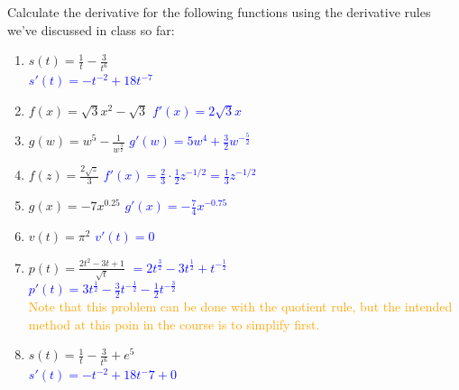 \documentclass{ximera}
\begin{document}
\begin{exercise}
Calculate the derivative for the following functions using the derivative rules we've discussed in class so far: 
\begin{enumerate}
    \item $s(t)=\frac{1}{t}-\frac{3}{t^6}$\\
    \textcolor{blue}{$s'(t)=-t^{-2}+18t^{-7}$}

    \item $f(x)=\sqrt{3}x^2-\sqrt{3}$
    \textcolor{blue}{ $f'(x)=2\sqrt{3}x$}
    
    \item $g(w)=w^5-\frac{1}{w^\frac{3}{2}}$
    \textcolor{blue}{ $g'(w)=5w^4+\frac{3}{2}w^{-\frac{5}{2}}$}
    
    \item $f(z)=\frac{2\sqrt{z}}{3}$ 
    \textcolor{blue}{ $f'(x)= \frac{2}{3}\cdot \frac12 z^{-1/2}=\frac13 z^{-1/2}$}
    
    \item $g(x)=-7x^{0.25}$
    \textcolor{blue}{ $g'(x)=-\frac{7}{4}x^{-0.75}$}
    
    \item $v(t)=\pi^2$
    \textcolor{blue}{ $v'(t)=0$}
    
    \item $p(t)=\frac{2t^2-3t+1}{\sqrt{t}}$ \textcolor{blue}{ $=2t^{\frac32}-3t^{\frac12}+t^{-\frac12}$}\\
    \textcolor{blue}{ $p'(t)=3t^{\frac12}-\frac32 t^{-\frac12}-\frac12t^{-\frac32}$}\\
    \textcolor{orange}{Note that this problem can be done with the quotient rule, but the intended method at this poin in the course is to simplify first.}

    \item $s(t)=\frac{1}{t}-\frac{3}{t^6}+e^5$\\
    \textcolor{blue}{ $s'(t)=-t^{-2}+18t^-7+0$}
\end{enumerate}
\end{exercise}
\end{document}
